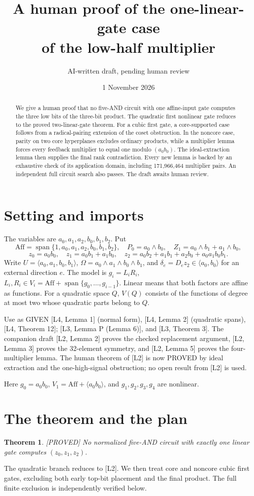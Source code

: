 \documentclass[11pt,a4paper]{article}
\title{A human proof of the one-linear-gate case\\of the low-half multiplier}
\author{AI-written draft, pending human review}
\date{1 November 2026}
\newtheorem{theorem}{Theorem}
\newcommand{\Aff}{\mathrm{Aff}}
\newcommand{\Span}{\operatorname{span}}
\newcommand{\status}[1]{\hfill\textsf{[#1]}}
\begin{document}
\maketitle
\begin{abstract}
We give a human proof that no five-AND circuit with one affine-input gate computes the three low bits of the three-bit product. The quadratic first nonlinear gate reduces to the proved two-linear-gate theorem. For a cubic first gate, a core-supported case follows from a radical-pairing extension of the coset obstruction. In the noncore case, parity on two core hyperplanes excludes ordinary products, while a multiplier lemma forces every feedback multiplier to equal one modulo $(a_0b_0)$. The ideal-extraction lemma then supplies the final rank contradiction. Every new lemma is backed by an exhaustive check of its application domain, including 171,966,464 multiplier pairs. An independent full circuit search also passes. The draft awaits human review.
\end{abstract}

\section{Setting and imports}
The variables are $a_0,a_1,a_2,b_0,b_1,b_2$. Put
\[
\Aff=\Span\{1,a_0,a_1,a_2,b_0,b_1,b_2\},\quad
P_0=a_0\wedge b_0,\quad Z_1=a_0\wedge b_1+a_1\wedge b_0,
\]
\[
z_0=a_0b_0,\quad z_1=a_0b_1+a_1b_0,\quad
z_2=a_0b_2+a_1b_1+a_2b_0+a_0a_1b_0b_1.
\]
Write $U=\langle a_0,a_1,b_0,b_1\rangle$, $\Omega=a_0\wedge a_1\wedge b_0\wedge b_1$, and $\delta_e=D_ez_2\in\langle a_0,b_0\rangle$ for an external direction $e$. The model is $g_i=L_iR_i$, $L_i,R_i\in V_i=\Aff+\Span\{g_0,\ldots,g_{i-1}\}$. Linear means that both factors are affine as functions. For a quadratic space $Q$, $V(Q)$ consists of the functions of degree at most two whose quadratic parts belong to $Q$.

Use as GIVEN [L4, Lemma 1] (normal form), [L4, Lemma 2] (quadratic spans), [L4, Theorem 12]; [L3, Lemma P (Lemma 6)], and [L3, Theorem 3]. The companion draft [L2, Lemma 2] proves the checked replacement argument, [L2, Lemma 3] proves the 32-element symmetry, and [L2, Lemma 5] proves the four-multiplier lemma. The human theorem of [L2] is now PROVED by ideal extraction and the one-high-signal obstruction; no open result from [L2] is used.

Here $g_0=a_0b_0$, $V_1=\Aff+\langle a_0b_0\rangle$, and $g_1,g_2,g_3,g_4$ are nonlinear.

\section{The theorem and the plan}
\begin{theorem}\label{thm:main}\status{PROVED}
No normalized five-AND circuit with exactly one linear gate computes $(z_0,z_1,z_2)$.
\end{theorem}
The quadratic branch reduces to [L2]. We then treat core and noncore cubic first gates, excluding both early top-bit placement and the final product. The full finite exclusion is independently verified below.
\end{document}
